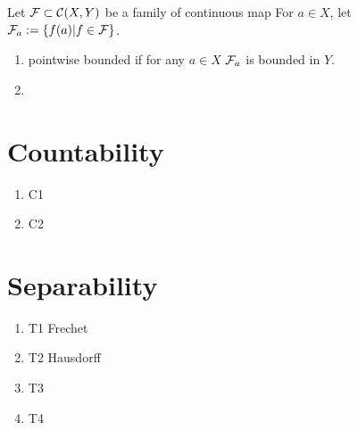 \begin{definition}
    Let $\mathcal{F}\subset \mathcal{C}(X,Y)$ be a family of continuous map
    For $a\in X$, let $\mathcal{F}_a:=\{f(a)|f\in\mathcal{F}\}$.
    \begin{enumerate}[label=(\roman*)]
        \item pointwise bounded if for any $a\in X$ $\mathcal{F}_a$ is bounded in $Y$.
        \item 
    \end{enumerate}
\end{definition}

\begin{theorem}
    
\end{theorem}

\section{Countability}

\begin{definition}
    \begin{enumerate}
        \item C1
        \item C2
    \end{enumerate}
\end{definition}



\section{Separability}

\begin{definition}
    \begin{enumerate}
        \item T1 Frechet
        \item T2 Hausdorff
        \item T3
        \item T4
    \end{enumerate}
\end{definition}